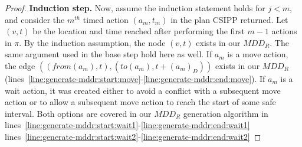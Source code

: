 \documentclass[review]{elsarticle}
\newcommand{\mddr}{\ensuremath{MDD_R}\xspace}
\newcommand{\fromv}{\ensuremath{\mathit{from}}\xspace}
\newcommand{\tov}{\ensuremath{\mathit{to}}\xspace}
\newcommand{\csipp}{\ac{CSIPP}\xspace}
\begin{document}
\begin{proof}
\textbf{Induction step.}
Now, assume the induction statement holds for $j<m$, and consider the $m^{th}$ timed action $(a_m, t_m)$ in the plan \csipp returned. 
Let $(v,t)$ be the location and time reached after performing the first $m-1$ actions in $\pi$. 
By the induction assumption, the node $(v,t)$ exists in our \mddr. 
The same argument used in the base step hold here as well. 
If $a_m$ is a move action, the edge $((\fromv(a_m), t),(\tov(a_m),t+(a_m)_D))$ exists in our \mddr (lines~\ref{line:generate-mddr:start:move}-\ref{line:generate-mddr:end:move}). 
If $a_m$ is a wait action, it was created either to avoid a conflict with a subsequent move action or to allow a subsequent move action to reach the start of some safe interval.  
Both options are covered in our \mddr generation algorithm in 
lines~\ref{line:generate-mddr:start:wait1}-\ref{line:generate-mddr:end:wait1}
lines~\ref{line:generate-mddr:start:wait2}-\ref{line:generate-mddr:end:wait2}
\end{proof}

\end{document}
